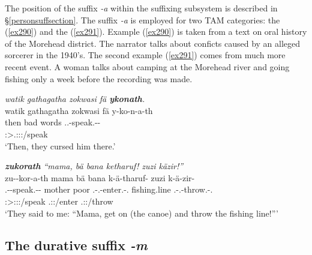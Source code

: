 The position of the  suffix \emph{-a} within the suffixing subsystem is described in \S{}\ref{personsuffsection}. The  suffix \emph{-a} is employed for two TAM categories: the   (\ref{ex290}) and the   (\ref{ex291}). Example (\ref{ex290}) is taken from a text on oral history of the Morehead district. The narrator talks about conficts caused by an alleged sorcerer in the 1940's. The second example (\ref{ex291}) comes from much more recent event. A woman talks about camping at the Morehead river and going fishing only a week before the recording was made.

\begin{exe}
	\ex \emph{watik gathagatha zokwasi fä \textbf{ykonath}.}\\
	\glll watik {gathagatha} zokwasi fä y-ko-n-a-th\\
	then {bad} words \Dist{} \Tsg.\Masc.\Alph-speak.\Ext-\Du-\Stnsg{}\\
	{} {} {} {} \footnotesize{\Stdu:\Sbj>\Tsg.\Masc:\Obj:\Pst:\Ipfv/speak}\\
	\trans `Then, they cursed him there.'
	\label{ex290}
\end{exe}
\begin{exe}
	\ex \emph{\textbf{zukorath} ``mama, bä bana ketharuf! zuzi käzir!''}\\
	\glll zu-\Zero{}-kor-a-th mama bä bana k-ä-tharuf-\Zero{} zuzi k-ä-zir-\Zero\\
	\Fsg.\Gam-\Du-speak.\Rs-\Pst-\Stnsg{} mother \Ssg{} poor \M.\Bet-\Vc.\Ndu-enter.\Rs-\Ssg.\Imp{} fishing.line \M.\Bet-\Vc.\Ndu-throw.\Rs-\Ssg.\Imp{}\\
	\footnotesize{\Stdu:\Sbj>\Fsg:\Obj:\Pst:\Pfv/speak} {} {} {} \footnotesize{\Ssg.\Sbj:\Imp:\Pfv/enter} {} \footnotesize{\Ssg.\Sbj:\Imp:\Pfv/throw}\\
	\trans `They said to me: ``Mama, get on (the canoe) and throw the fishing line!'''\\
	\label{ex291}
\end{exe}

\subsection{The durative suffix \emph{-m}}\label{durativesuffixm}

